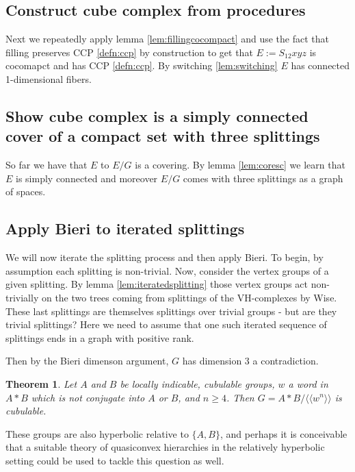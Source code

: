 \documentclass[12pt,parskip=full]{report}
\theoremstyle{plain}
\newtheorem{thm}{Theorem}[section]
\theoremstyle{definition}
\newcommand{\nc}[1]{\langle\langle#1\rangle\rangle} %
\begin{document}
\subsection{Construct cube complex from procedures}

Next we repeatedly apply lemma \ref{lem:fillingcocompact} and use the fact that filling preserves CCP \ref{defn:ccp} by construction to get that \(E:= S_{12}xyz\) is cocomapct and has CCP \ref{defn:ccp}. By switching \ref{lem:switching} \(E\) has connected 1-dimensional fibers. 

\subsection{Show cube complex is a simply connected cover of a compact set with three splittings}

So far we have that $E$ to $E/G$ is a covering. By lemma \ref{lem:coresc} we learn that \(E\) is simply connected and moreover \(E/G\) comes with three splittings as a graph of spaces.

\subsection{Apply Bieri to iterated splittings}
We will now iterate the splitting process and then apply Bieri. To begin, by assumption each splitting is non-trivial. Now, consider the vertex groups of a given splitting. By lemma \ref{lem:iteratedsplitting} those vertex groups act non-trivially on the two trees coming from splittings of the VH-complexes by Wise. These last splittings are themselves splittings over trivial groups - but are they trivial splittings? Here we need to assume that one such iterated sequence of splittings ends in a graph with positive rank.
        
Then by the Bieri dimenson argument, \(G\) has dimension 3 a contradiction.

\noindent
\begin{thm}
\label{main}
Let $A$ and $B$ be locally indicable, cubulable groups, $w$ a word in $A*B$ which is not conjugate into $A$ or $B$, and $n\geq 4$. Then $G=A*B/\nc{w^n}$ is cubulable.
\end{thm}


These groups are also hyperbolic relative to $\{A,B\}$, and perhaps it is conceivable that a suitable theory of quasiconvex hierarchies in the relatively hyperbolic setting could be used to tackle this question as well.

\cleardoublepage
\end{document}
